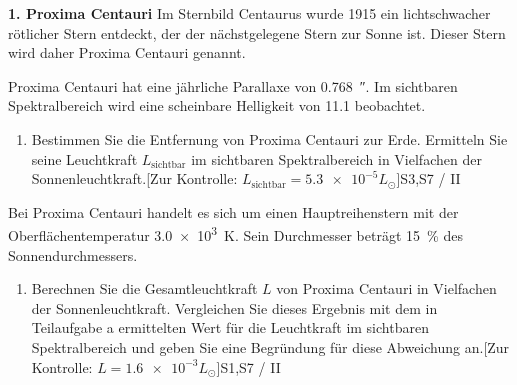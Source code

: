 \begin{aufgabe}
	\textbf{1. Proxima Centauri}\newline
	Im Sternbild Centaurus wurde 1915 ein lichtschwacher rötlicher Stern entdeckt, der der nächstgelegene Stern zur Sonne ist. Dieser Stern wird daher Proxima Centauri genannt.

	Proxima Centauri hat eine jährliche Parallaxe von \SI{0.768}{\arcsecond}. Im sichtbaren Spektralbereich wird eine scheinbare Helligkeit von \num{11.1} beobachtet.
	\begin{enumerate}
	 	\item Bestimmen Sie die Entfernung von Proxima Centauri zur Erde. Ermitteln Sie seine Leuchtkraft $L_{\text{sichtbar}}$ im sichtbaren Spektralbereich in Vielfachen der Sonnenleuchtkraft.\hfill [Zur Kontrolle: $L_{\text{sichtbar}}=\num{5.3e-5}L_{\odot}$]\newline \hfill S3,S7 / II
	\end{enumerate}
	Bei Proxima Centauri handelt es sich um einen Hauptreihenstern mit der Oberflächentemperatur \SI{3.0e3}{\kelvin}. Sein Durchmesser beträgt \SI{15}{\percent} des Sonnendurchmessers.
	\begin{enumerate}[resume]
	 	\item Berechnen Sie die Gesamtleuchtkraft $L$ von Proxima Centauri in Vielfachen der Sonnenleuchtkraft. Vergleichen Sie dieses Ergebnis mit dem in Teilaufgabe a ermittelten Wert für die Leuchtkraft im sichtbaren Spektralbereich und geben Sie eine Begründung für diese Abweichung an.\hfill [Zur Kontrolle: $L=\num{1.6e-3}L_\odot$]\newline \hfill S1,S7 / II
	\end{enumerate}
\end{aufgabe}


